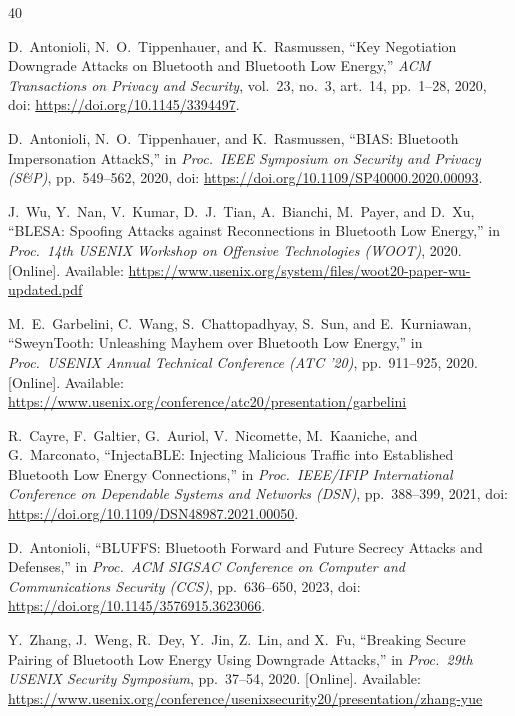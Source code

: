 \documentclass[journal]{IEEEtran}
\begin{document}
\begin{thebibliography}{40}

D.~Antonioli, N.~O.~Tippenhauer, and K.~Rasmussen,  ``Key Negotiation Downgrade Attacks on Bluetooth and Bluetooth Low Energy,''  \emph{ACM Transactions on Privacy and Security}, vol.~23, no.~3,  art.~14, pp.~1--28, 2020, doi: \url{https://doi.org/10.1145/3394497}.

D.~Antonioli, N.~O.~Tippenhauer, and K.~Rasmussen, ``BIAS: Bluetooth Impersonation AttackS,'' in \emph{Proc.\ IEEE Symposium on Security and Privacy (S\&P)}, pp.~549--562, 2020, doi: \url{https://doi.org/10.1109/SP40000.2020.00093}.

J.~Wu, Y.~Nan, V.~Kumar, D.~J.~Tian, A.~Bianchi, M.~Payer, and D.~Xu, ``BLESA: Spoofing Attacks against Reconnections in Bluetooth Low Energy,'' in \emph{Proc.\ 14th USENIX Workshop on Offensive Technologies (WOOT)}, 2020. [Online]. Available: \url{https://www.usenix.org/system/files/woot20-paper-wu-updated.pdf}


M.~E.~Garbelini, C.~Wang, S.~Chattopadhyay, S.~Sun, and E.~Kurniawan, ``SweynTooth: Unleashing Mayhem over Bluetooth Low Energy,'' in \emph{Proc.\ USENIX Annual Technical Conference (ATC '20)}, pp.~911--925, 2020. [Online]. Available: \url{https://www.usenix.org/conference/atc20/presentation/garbelini}

R.~Cayre, F.~Galtier, G.~Auriol, V.~Nicomette, M.~Kaaniche, and G.~Marconato, ``InjectaBLE: Injecting Malicious Traffic into Established Bluetooth Low Energy Connections,'' in \emph{Proc.\ IEEE/IFIP International Conference on Dependable Systems and Networks (DSN)}, pp.~388--399, 2021, doi: \url{https://doi.org/10.1109/DSN48987.2021.00050}.

D.~Antonioli, ``BLUFFS: Bluetooth Forward and Future Secrecy Attacks and Defenses,'' in \emph{Proc.\ ACM SIGSAC Conference on Computer and Communications Security (CCS)}, pp.~636--650, 2023, doi: \url{https://doi.org/10.1145/3576915.3623066}.

Y.~Zhang, J.~Weng, R.~Dey, Y.~Jin, Z.~Lin, and X.~Fu, ``Breaking Secure Pairing of Bluetooth Low Energy Using Downgrade Attacks,'' in \emph{Proc.\ 29th USENIX Security Symposium}, pp.~37--54, 2020. [Online]. Available: \url{https://www.usenix.org/conference/usenixsecurity20/presentation/zhang-yue}


\end{thebibliography}
\end{document}
